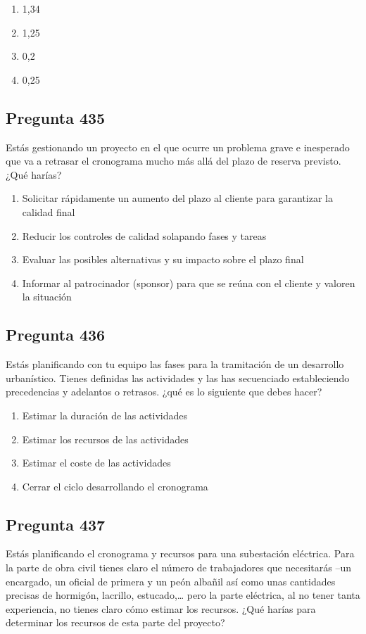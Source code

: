 \documentclass[11pt,a4paper]{article}
\begin{document}
\begin{enumerate}[label=\alph*)]
  \item 1,34
  \item 1,25
  \item 0,2
  \item 0,25
\end{enumerate}

\subsection*{Pregunta 435}
Estás gestionando un proyecto en el que ocurre un problema grave e inesperado que va a retrasar el cronograma mucho más allá del plazo de reserva previsto. ¿Qué harías?

\begin{enumerate}[label=\alph*)]
  \item Solicitar rápidamente un aumento del plazo al cliente para garantizar la calidad final
  \item Reducir los controles de calidad solapando fases y tareas
  \item Evaluar las posibles alternativas y su impacto sobre el plazo final
  \item Informar al patrocinador (sponsor) para que se reúna con el cliente y valoren la situación
\end{enumerate}

\subsection*{Pregunta 436}
Estás planificando con tu equipo las fases para la tramitación de un desarrollo urbanístico. Tienes definidas las actividades y las has secuenciado estableciendo precedencias y adelantos o retrasos. ¿qué es lo siguiente que debes hacer?

\begin{enumerate}[label=\alph*)]
  \item Estimar la duración de las actividades
  \item Estimar los recursos de las actividades
  \item Estimar el coste de las actividades
  \item Cerrar el ciclo desarrollando el cronograma
\end{enumerate}

\subsection*{Pregunta 437}
Estás planificando el cronograma y recursos para una subestación eléctrica. Para la parte de obra civil tienes claro el número de trabajadores que necesitarás –un encargado, un oficial de primera y un peón albañil así como unas cantidades precisas de hormigón, lacrillo, estucado,… pero la parte eléctrica, al no tener tanta experiencia, no tienes claro cómo estimar los recursos. ¿Qué harías para determinar los recursos de esta parte del proyecto?
\end{document}
